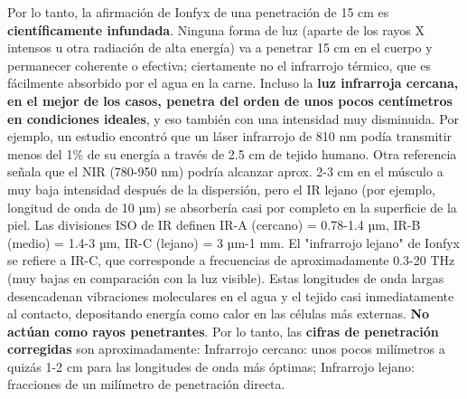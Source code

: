 \documentclass{article}
\begin{document}
Por lo tanto, la afirmación de Ionfyx de una penetración de 15 cm es \textbf{científicamente infundada}. Ninguna forma de luz (aparte de los rayos X intensos u otra radiación de alta energía) va a penetrar 15 cm en el cuerpo y permanecer coherente o efectiva; ciertamente no el infrarrojo térmico, que es fácilmente absorbido por el agua en la carne. Incluso la \textbf{luz infrarroja cercana, en el mejor de los casos, penetra del orden de unos pocos centímetros en condiciones ideales}, y eso también con una intensidad muy disminuida. Por ejemplo, un estudio encontró que un láser infrarrojo de 810 nm podía transmitir menos del 1\% de su energía a través de 2.5 cm de tejido humano. Otra referencia señala que el NIR (780-950 nm) podría alcanzar aprox. 2-3 cm en el músculo a muy baja intensidad después de la dispersión, pero el IR lejano (por ejemplo, longitud de onda de 10 µm) se absorbería casi por completo en la superficie de la piel. Las divisiones ISO de IR definen IR-A (cercano) = 0.78-1.4 µm, IR-B (medio) = 1.4-3 µm, IR-C (lejano) = 3 µm-1 mm. El "infrarrojo lejano" de Ionfyx se refiere a IR-C, que corresponde a frecuencias de aproximadamente 0.3-20 THz (muy bajas en comparación con la luz visible). Estas longitudes de onda largas desencadenan vibraciones moleculares en el agua y el tejido casi inmediatamente al contacto, depositando energía como calor en las células más externas. \textbf{No actúan como rayos penetrantes}. Por lo tanto, las \textbf{cifras de penetración corregidas} son aproximadamente: Infrarrojo cercano: unos pocos milímetros a quizás 1-2 cm para las longitudes de onda más óptimas; Infrarrojo lejano: fracciones de un milímetro de penetración directa.
\end{document}
